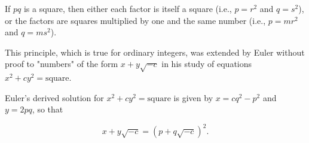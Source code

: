 If $pq$ is a square, then either each factor is itself a square (i.e., $p = r^2$ and $q = s^2$), or the factors are squares multiplied by one and the same number (i.e., $p = mr^2$ and $q = ms^2$).

This principle, which is true for ordinary integers, was extended by Euler without proof to "numbers" of the form $x + y\sqrt{-c}$ in his study of equations $x^2 + cy^2 = \text{square}$.

Euler's derived solution for $x^2 + cy^2 = \text{square}$ is given by $x = cq^2 - p^2$ and $y = 2pq$, so that

$$
x + y\sqrt{-c} = (p + q\sqrt{-c})^2.
$$
